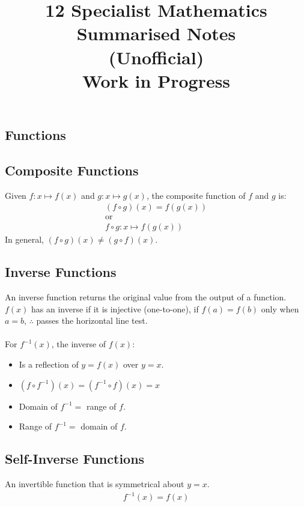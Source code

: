 \documentclass[10pt, a4paper, titlepage]{article}
\begin{document}
\title{12 Specialist Mathematics Summarised Notes \\ (Unofficial) \\ Work in Progress}
\author{}
\date{}
\maketitle

\begin{multicols*}{3}

\section{Functions}
	\subsection{Composite Functions}
	Given $f:x\mapsto f(x)$ and $g:x\mapsto g(x)$, the composite function of $f$ and $g$ is:
	\begin{gather}
		(f\circ g)(x)=f(g(x))\\
		\text{or}\\
		f\circ g:x\mapsto f(g(x))
	\end{gather}
	In general, $(f\circ g)(x)\neq (g\circ f)(x)$.

	\dotfill
	\subsection{Inverse Functions}
	An inverse function returns the original value from the output of a function.\\
	$f(x)$ has an inverse if it is injective (one-to-one), if $f(a)=f(b)$ only when $a=b$, $\therefore$ passes the horizontal line test.\\\\
	For $f^{-1}(x)$, the inverse of $f(x)$:
	\begin{itemize}
		\item Is a reflection of $y=f(x)$ over $y=x$.
		\item $(f\circ f^{-1})(x)=(f^{-1}\circ f)(x)=x$
		\item Domain of $f^{-1}=$ range of $f$.
		\item Range of $f^{-1}=$ domain of $f$.
	\end{itemize}

	\dotfill
	\subsection{Self-Inverse Functions}
	An invertible function that is symmetrical about $y=x$.
	\begin{align}
		f^{-1}(x)=f(x)
	\end{align}


\end{multicols*}
\end{document}
